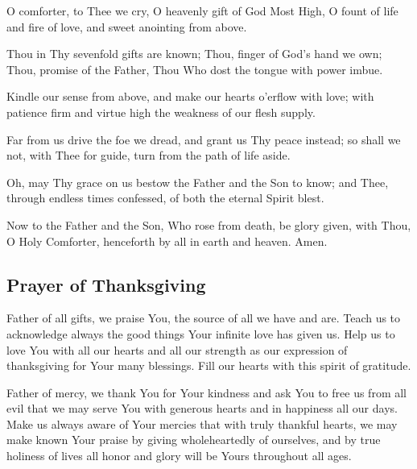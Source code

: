 \documentclass[12pt]{article}
\newcommand{\prayertitle}[1]{\subsection{#1}}
\begin{document}
O comforter, to Thee we cry,
O heavenly gift of God Most High,
O fount of life and fire of love,
and sweet anointing from above.

Thou in Thy sevenfold gifts are known;
Thou, finger of God's hand we own;
Thou, promise of the Father, Thou
Who dost the tongue with power imbue.

Kindle our sense from above,
and make our hearts o'erflow with love;
with patience firm and virtue high
the weakness of our flesh supply.

Far from us drive the foe we dread,
and grant us Thy peace instead;
so shall we not, with Thee for guide,
turn from the path of life aside.

Oh, may Thy grace on us bestow
the Father and the Son to know;
and Thee, through endless times confessed,
of both the eternal Spirit blest.

Now to the Father and the Son,
Who rose from death, be glory given,
with Thou, O Holy Comforter,
henceforth by all in earth and heaven.
Amen.

\prayertitle{Prayer of Thanksgiving}
Father of all gifts, we praise You, the source of all we have and are.
Teach us to acknowledge always the good things Your infinite love has given us.
Help us to love You with all our hearts and all our strength as our expression of thanksgiving for Your many blessings.
Fill our hearts with this spirit of gratitude.

Father of mercy, we thank You for Your kindness and ask You to free us from all evil that we may serve You with generous hearts and in happiness all our days.
Make us always aware of Your mercies that with truly thankful hearts, we may make known Your praise by giving wholeheartedly of ourselves, and by true holiness of lives all honor and glory will be Yours throughout all ages.
\end{document}
